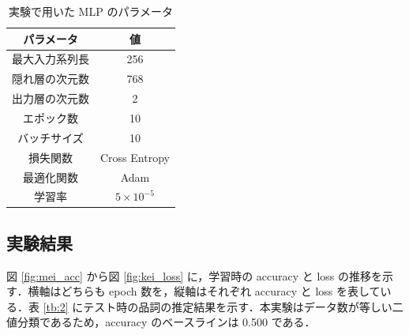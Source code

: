 \documentclass[twocolumn]{jarticle}
\begin{document}
\begin{table}[t]
	\caption{実験で用いた MLP のパラメータ}
  \begin{center}
  \begin{tabular}{|c|c|} \hline
  パラメータ & 値  \\ \hline \hline
  最大入力系列長	& 256 \\ %
  隠れ層の次元数	& 768 \\
  出力層の次元数	& 2 \\
  エポック数 & 10 \\
  バッチサイズ & 10 \\
  損失関数 & Cross Entropy \\
  最適化関数 & Adam \\
  学習率 & $5\times10^{-5}$ \\ \hline
	\end{tabular}
  \end{center}
	\label{tb:1}
\end{table}




\subsection{実験結果}

図 \ref{fig:mei_acc} から図 \ref{fig:kei_loss} に，学習時の accuracy と loss の推移を示す．横軸はどちらも epoch 数を，縦軸はそれぞれ accuracy と loss を表している．表 \ref{tb:2} にテスト時の品詞の推定結果を示す．本実験はデータ数が等しい二値分類であるため，accuracy のベースラインは 0.500 である．
\end{document}
